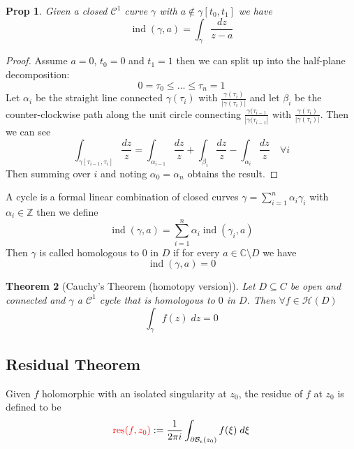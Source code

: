\documentclass[11pt]{article}
\newcommand{\defeq}{:=}
\newcommand{\abs}[1]{\left|#1\right|}
\DeclareMathOperator{\ind}{\text{ind}}
\DeclareMathOperator{\res}{\text{res}}
\newcommand{\C}{\mathbb{C}}
\newcommand{\Z}{\mathbb{Z}}
\newenvironment{defin}
	{\begin{mdframed}[backgroundcolor=white, roundcorner=5pt, linewidth=1pt]}
	{\end{mdframed}}
\newcommand{\mdf}[1]{{\color{red} #1}}
\newtheorem{theorem}{Theorem}[section]
\newtheorem{prop}[theorem]{Prop}
\begin{document}
\begin{prop}
Given a closed $\mathcal{C}^1$ curve $\gamma$ with $a\not\in\gamma[t_0, t_1]$ we have
\[
	\ind(\gamma, a)=\int_\gamma\frac{dz}{z-a}
\]
\end{prop}

\begin{proof}
Assume $a=0$, $t_0=0$ and $t_1=1$ then we can split up into the half-plane decomposition: 
\[
0=\tau_0 \leq \dots \leq \tau_n =1
\]
Let $\alpha_i$ be the straight line connected $\gamma(\tau_i)$ with $\frac{\gamma(\tau_i)}{\abs{\gamma(\tau_i)}}$ and let $\beta_i$ be the counter-clockwise path along the unit circle connecting $\frac{\gamma(\tau_{i-1}}{\abs{\gamma(\tau_{i-1}}}$ with $\frac{\gamma(\tau_i)}{\abs{\gamma(\tau_i)}}$.
Then we can see
\[
	\int_{\gamma[\tau_{i-1}, \tau_i]}\frac{dz}{z}=\int_{\alpha_{i-1}}\frac{dz}{z}+\int_{\beta_i}\frac{dz}{z}-\int_{\alpha_i}\frac{dz}{z}\quad\forall i
\]
Then summing over $i$ and noting $\alpha_0=\alpha_n$ obtains the result.
\end{proof}

\begin{defin}
	A \mdf{cycle} is a formal linear combination of closed curves $\gamma=\sum_{i=1}^{n}\alpha_i\gamma_i$ with $\alpha_i\in\Z$ then we define
	\[
		\ind(\gamma,a)=\sum_{i=1}^{n}\alpha_i\ind(\gamma_i, a)
	\]
	Then $\gamma$ is called \mdf{homologous to $0$ in $D$} if for every $a\in\C\setminus D$ we have
	\[
		\ind(\gamma, a)=0
	\]
\end{defin}

\begin{theorem}[Cauchy's Theorem (homotopy version)]
Let $D\subseteq C$ be open and connected and $\gamma$ a $\mathcal{C}^1$ cycle that is homologous to $0$ in $D$.
Then $\forall f\in\mathcal{H}(D)$
\[
	\int_\gamma f(z)\;dz=0
\]
\end{theorem}

\subsection{Residual Theorem}

\begin{defin}
	Given $f$ holomorphic with an isolated singularity at $z_0$, the \mdf{residue of $f$ at $z_0$} is defined to be
	\[
		\mdf{\res(f,z_0)}\defeq\frac{1}{2\pi i}\int_{\partial \mathcal{B}_\epsilon(z_0)}f(\xi)\;d\xi
	\]
\end{defin}
\end{document}
